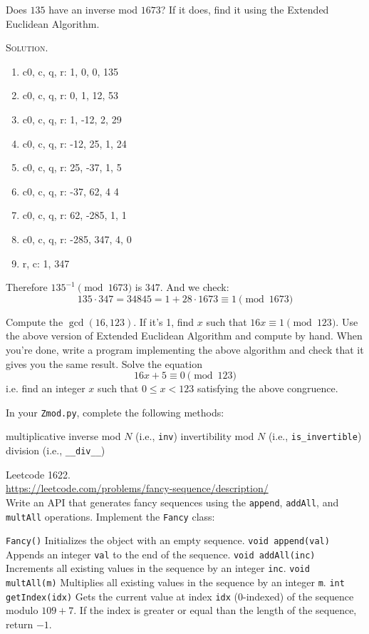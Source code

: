 \begin{eg}
Does $135$ have an inverse mod $1673$?
If it does, find it using the Extended Euclidean Algorithm.
\end{eg}
\textsc{Solution}.
\begin{enumerate}[nosep]
  \item c0, c, q, r: 1, 0, 0, 135
  \item c0, c, q, r: 0, 1, 12, 53
  \item c0, c, q, r: 1, -12, 2, 29
  \item c0, c, q, r: -12, 25, 1, 24
  \item c0, c, q, r: 25, -37, 1, 5
  \item c0, c, q, r: -37, 62, 4 4
  \item c0, c, q, r: 62, -285, 1, 1
  \item c0, c, q, r: -285, 347, 4, 0
  \item r, c: 1, 347
\end{enumerate}
Therefore $135^{-1} \pmod{1673}$ is $347$.
And we check:
\[
135 \cdot 347 = 34845 = 1 + 28 \cdot 1673 \equiv 1 \pmod{1673}  
\]


\begin{ex}
Compute the $\gcd(16, 123)$.
If it's 1, find $x$ such that $16x \equiv 1 \pmod{123}$.
Use the above version of Extended Euclidean Algorithm and compute by hand.
When you're done, write a program implementing the above algorithm
and check that it gives you the same result.
Solve the equation
\[
16x + 5 \equiv 0 \pmod{123}
\]
i.e. find an integer $x$ such that $0 \leq x < 123$ satisfying the
above congruence.
\end{ex}


\begin{ex}
  In your \verb!Zmod.py!, complete the following methods:
  \begin{enumerate}[nosep]
    \li multiplicative inverse mod $N$ (i.e., \texttt{inv})
    \li invertibility mod $N$ (i.e., \texttt{is\_invertible})
    \li division (i.e., \texttt{\_\_div\_\_})
  \end{enumerate}
\end{ex}


\begin{ex}
  Leetcode 1622.\\
  \url{https://leetcode.com/problems/fancy-sequence/description/}\\
  Write an API that generates fancy sequences using the
  \texttt{append}, \texttt{addAll}, and \texttt{multAll} operations.
  Implement the \texttt{Fancy} class:
  \begin{enumerate}[nosep]
    \li \texttt{Fancy()} Initializes the object with an empty sequence.
    \li \texttt{void append(val)}
    Appends an integer \texttt{val} to the end of the sequence.
    \li \texttt{void addAll(inc)}
    Increments all existing values in the sequence by an integer \texttt{inc}.
    \li \texttt{void multAll(m)}
    Multiplies all existing values in the sequence by an integer \texttt{m}.
    \li \texttt{int getIndex(idx)}
    Gets the current value at index \texttt{idx} ($0$-indexed)
    of the sequence modulo $109 + 7$.
    If the index is greater or equal than the length of the sequence,
    return $-1$.
\end{enumerate}
\end{ex}
